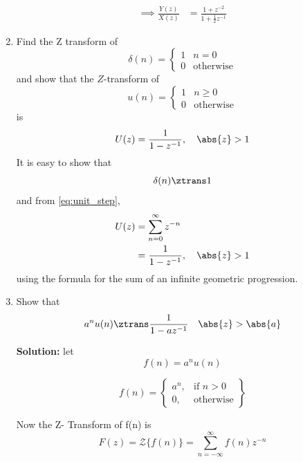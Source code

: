 \documentclass[journal,12pt,twocolumn]{IEEEtran}
\renewcommand\thesection{\arabic{section}}
\begin{document}
\begin{enumerate}[label=\thesection.\arabic*]
\begin{align}
\implies \frac{Y(z)}{X(z)} &= \frac{1 + z^{-2}}{1 + \frac{1}{2}z^{-1}}
\label{eq:freq_resp}
\end{align}
%
\item Find the Z transform of 
\begin{equation}
\delta(n)
=
\begin{cases}
1 & n = 0
\\
0 & \text{otherwise}
\end{cases}
\end{equation}
and show that the $Z$-transform of
\begin{equation}
\label{eq:unit_step}
u(n)
=
\begin{cases}
1 & n \ge 0
\\
0 & \text{otherwise}
\end{cases}
\end{equation}
is
\begin{equation}
U(z) = \frac{1}{1-z^{-1}}, \quad \abs{z} > 1
\end{equation}
\solution It is easy to show that
\begin{equation}
\delta(n) \ztrans 1
\end{equation}
and from \eqref{eq:unit_step},
\begin{align}
U(z) &= \sum _{n= 0}^{\infty}z^{-n}
\\
&=\frac{1}{1-z^{-1}}, \quad \abs{z} > 1
\end{align}
using the formula for the sum of an infinite geometric progression.
%
\item Show that 
\begin{equation}
\label{eq:anun}
a^nu(n) \ztrans \frac{1}{1-az^{-1}} \quad \abs{z} > \abs{a}
\end{equation}
%

\textbf{Solution: }
let
\begin{equation}
    f(n) = a^n u(n)
\end{equation}

\begin{equation}
f(n) = 
\left\{
    \begin{array}{lr}
        a^n, & \text{if } n>0\\
        0  , & \text{otherwise}
    \end{array}
\right\}
\end{equation}

Now the Z- Transform of f(n) is
\begin{equation}
    F(z) = {\mathcal {Z}}\{f(n)\} = \sum_{n=-\infty}^{\infty} f(n)z^{-n}
\end{equation}


\end{enumerate}
\end{document}
